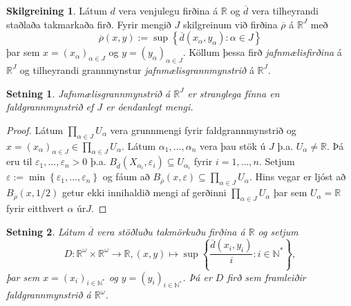 \documentclass[a4paper,icelandic]{book}
\theoremstyle{definition}
\newtheorem{skilgr}{Skilgreining}[section]
\theoremstyle{plain}
\newtheorem{setn}{Setning}[section]
\theoremstyle{remark}
\newcommand{\R}{\mathbb{R}} %
\newcommand{\N}{\mathbb{N}} %
\begin{document}
\begin{skilgr}
  Látum $d$ vera venjulegu firðina á $\R$ og $\overline d$ vera tilheyrandi
  staðlaða takmarkaða firð. Fyrir mengið $J$ skilgreinum við firðina $\overline
  \rho$ á $\R^J$ með\[
  \overline\rho(x,y)
  := \sup\left\{ \overline d(x_\alpha,y_\alpha) : \alpha\in J \right\}
  \]
  þar sem $x = (x_\alpha)_{\alpha\in J}$ og $y = (y_\alpha)_{\alpha\in J}$.
  Köllum þessa firð \emph{jafnmælisfirðina}
  á $\R^J$ og tilheyrandi grannmynstur
  \emph{jafnmælisgrannmynstrið} á $\R^J$.
\end{skilgr}
\begin{setn}
  \emph{Jafnmælisgrannmynstrið} á $\R^J$ er stranglega fínna en
  faldgrannmynstrið ef $J$ er óendanlegt mengi.
\end{setn}
\begin{proof}
  Látum $\prod_{\alpha\in J}U_\alpha$ vera grunnmengi fyrir faldgrannmynstrið og
  $x = (x_\alpha)_{\alpha\in J}\in\prod_{\alpha\in J}U_\alpha$. Látum
  $\alpha_1,\dots,\alpha_n$ vera þau stök ú $J$ þ.a. $U_\alpha\neq \R$. Þá eru
  til $\varepsilon_1,\dots,\varepsilon_n>0$ þ.a. $B_{\overline
  d}(X_{\alpha_i},\varepsilon_i)\subseteq U_{\alpha_i}$ fyrir $i=1,\dots,n$.
  Setjum $\varepsilon := \min \left\{ \varepsilon_1,\dots,\varepsilon_n
  \right\}$ og fáum að $B_{\overline
  \rho}(x,\varepsilon)\subseteq\prod_{\alpha\in J}U_\alpha$. Hins vegar er ljóst
  að $B_{\overline\rho}(x,1/2)$ getur ekki innihaldið mengi af gerðinni
  $\prod_{\alpha\in J}U_\alpha$ þar sem $U_\alpha = \R$ fyrir eitthvert
  $\alpha$ úr$J$.
\end{proof}
\begin{setn}
  Látum $\overline d$ vera stöðluðu takmörkuðu firðina á $\R$ og setjum
  \[
  D:\R^\omega\times\R^\omega\to\R,
  (x,y)\mapsto\sup\left\{ \frac{\overline d(x_i,y_i)}{i} : i\in\N^* \right\},
  \]
  þar sem $x = (x_i)_{i\in\N^*}$ og $y=(y_i)_{i\in\N^*}$. Þá er $D$ firð sem
  framleiðir faldgrannmynstrið á $\R^\omega$.
\end{setn}
\end{document}
